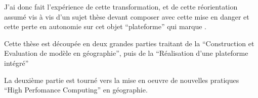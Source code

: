  J'ai donc fait l'expérience de cette transformation, et de cette réorientation assumé vis à vis d'un sujet thèse devant composer avec cette mise en danger et cette perte en autonomie sur cet objet \enquote{plateforme} qui marque . 



Cette thèse est découpée en deux grandes parties traitant de la \enquote{Construction et Evaluation de modèle en géographie}, puis de la \enquote{Réalisation d'une plateforme intégré}








La deuxième partie est tourné vers la mise en oeuvre de nouvelles pratiques \enquote{High Perfomance Computing} en géographie.






